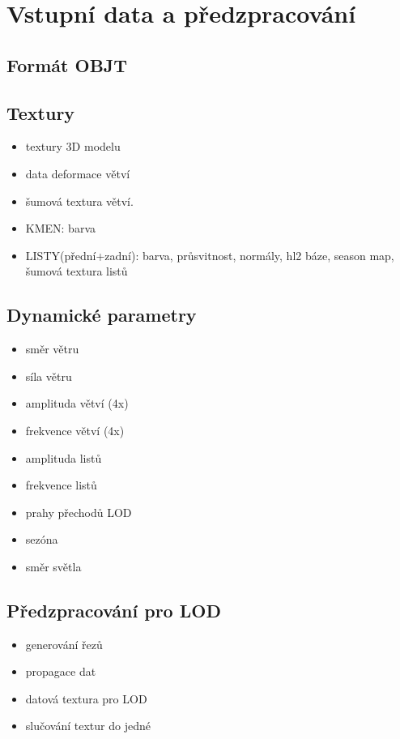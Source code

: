 \section{Vstupní data a předzpracování}
\label{sec-modelAnalysis}


\subsection{Formát OBJT}
\subsection{Textury}
\begin{itemize}

 \item textury 3D modelu
\item  data deformace větví
\item šumová textura větví. 
\item KMEN: barva
\item  LISTY(přední+zadní): barva, průsvitnost, normály, hl2 báze, season map, šumová textura listů
\end{itemize}
\subsection{Dynamické parametry}
\begin{itemize}
 \item směr větru
 \item síla větru
\item amplituda větví (4x)
\item frekvence větví (4x)
\item amplituda listů
\item frekvence listů
\item prahy přechodů LOD
\item sezóna
\item směr světla
\end{itemize}
\subsection{Předzpracování pro LOD}
\begin{itemize}
 \item generování řezů
\item propagace dat 
\item datová textura pro LOD
\item slučování textur do jedné
\end{itemize}